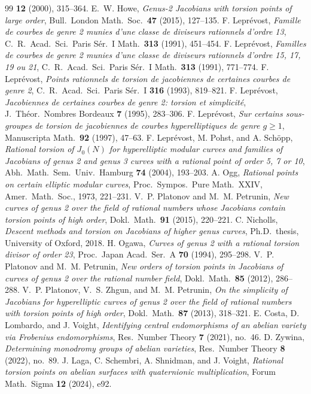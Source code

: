 \documentclass[11pt]{amsart}
\begin{document}
\begin{thebibliography}{99}
\textbf{12} (2000), 315--364.
 E.~W. Howe, \emph{Genus-2 Jacobians with torsion points of
large order}, Bull.\ London Math.\ Soc.\ \textbf{47} (2015), 127--135.
 F. Lepr\'evost, \emph{Famille de courbes de genre 2 munies
d'une classe de diviseurs rationnels d'ordre 13},
C.~R.\ Acad.\ Sci.\ Paris S\'er.\ I Math.\ \textbf{313} (1991), 451--454.
 F. Lepr\'evost, \emph{Familles de courbes de genre 2 munies
d'une classe de diviseurs rationnels d'ordre 15, 17, 19 ou 21},
C.~R.\ Acad.\ Sci.\ Paris S\'er.\ I Math.\ \textbf{313} (1991), 771--774.
 F. Lepr\'evost, \emph{Points rationnels de torsion de
jacobiennes de certaines courbes de genre 2}, C.~R.\ Acad.\ Sci.\ Paris S\'er.\ I
\textbf{316} (1993), 819--821.
 F. Lepr\'evost, \emph{Jacobiennes de certaines courbes de
genre 2: torsion et simplicit\'e}, J.~Th\'eor.\ Nombres Bordeaux \textbf{7} (1995),
283--306.
 F. Lepr\'evost, \emph{Sur certains sous-groupes de torsion
de jacobiennes de courbes hyperelliptiques de genre $g\ge 1$},
Manuscripta Math.\ \textbf{92} (1997), 47--63.
 F. Lepr\'evost, M. Pohst, and A. Sch\"opp, \emph{Rational torsion
of $J_0(N)$ for hyperelliptic modular curves and families of Jacobians of genus 2 and
genus 3 curves with a rational point of order 5, 7 or 10}, Abh.\ Math.\ Sem.\ Univ.\
Hamburg \textbf{74} (2004), 193--203.
 A. Ogg, \emph{Rational points on certain elliptic modular curves},
Proc.\ Sympos.\ Pure Math.\ XXIV, Amer.\ Math.\ Soc., 1973, 221--231.
\bibitem{PP2015} V.~P. Platonov and M.~M. Petrunin, \emph{New curves of genus 2 over
the field of rational numbers whose Jacobians contain torsion points of high order},
Dokl.\ Math.\ \textbf{91} (2015), 220--221.
 C. Nicholls, \emph{Descent methods and torsion on Jacobians
of higher genus curves}, Ph.D.\ thesis, University of Oxford, 2018.
\bibitem{Ogawa1994} H. Ogawa, \emph{Curves of genus 2 with a rational torsion
divisor of order 23}, Proc.\ Japan Acad.\ Ser.\ A \textbf{70} (1994), 295--298.
\bibitem{PP2012} V.~P. Platonov and M.~M. Petrunin, \emph{New orders of torsion
points in Jacobians of curves of genus 2 over the rational number field},
Dokl.\ Math.\ \textbf{85} (2012), 286--288.
 V.~P. Platonov, V.~S. Zhgun, and M.~M. Petrunin,
\emph{On the simplicity of Jacobians for hyperelliptic curves of genus 2 over the
field of rational numbers with torsion points of high order},
Dokl.\ Math.\ \textbf{87} (2013), 318--321.
 E. Costa, D. Lombardo, and J. Voight, \emph{Identifying central
endomorphisms of an abelian variety via Frobenius endomorphisms},
Res.\ Number Theory \textbf{7} (2021), no.~46.
 D. Zywina, \emph{Determining monodromy groups of abelian
varieties}, Res.\ Number Theory \textbf{8} (2022), no.~89.
 J. Laga, C. Schembri, A. Shnidman, and J. Voight,
\emph{Rational torsion points on abelian surfaces with quaternionic
multiplication}, Forum Math.\ Sigma \textbf{12} (2024), e92.
\end{thebibliography}
\end{document}
